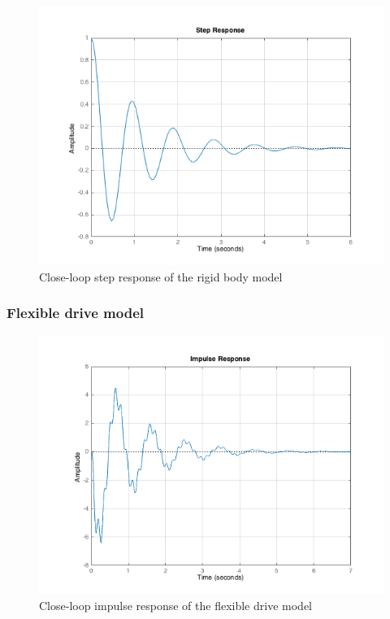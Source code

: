 \documentclass[a4paper, 12pt]{article}
\begin{document}
\begin{figure}[!htbp]
\centering
\includegraphics[scale = 0.6]{StepResponseNoControl}
\caption{Close-loop step response of the rigid body model}
\label{StepResponseNoControl}
\end{figure}

\subsubsection{Flexible drive model}

\begin{figure}[!htbp]
\centering
\includegraphics[scale = 0.6]{FlexibleImpulseResponseNoControl}
\caption{Close-loop impulse response of the flexible drive model}
\label{FlexibleImpulseResponseNoControl}
\end{figure}
\end{document}
